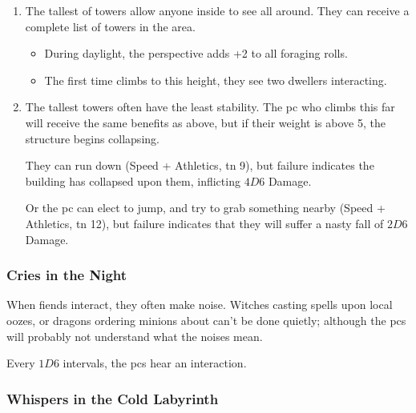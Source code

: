 \begin{multicols}{2}
\begin{enumerate}
  Any movement which disturbs the bones will send them falling down the stairs with a clank and a thud.
  \Glspl{pc} must roll Dexterity + Stealth (\gls{tn} 11) to move past the bones without issue, or else waste  moving everything down by hand (in this case they roll Dexterity + Crafts, \gls{tn} 7).
  \begin{itemize}
    \item
    During daylight, the perspective adds +2 to all foraging rolls.
  \end{itemize}
  \item
  The tallest of towers allow anyone inside to see all around.
  They can receive a complete list of towers in the area.
  \begin{itemize}
    \item
    During daylight, the perspective adds +2 to all foraging rolls.
    \item
    The first time  climbs to this height, they see two dwellers interacting.
  \end{itemize}
  \item
  The tallest towers often have the least stability.
  The \gls{pc} who climbs this far will receive the same benefits as above, but if their \gls{weight} is above 5, the structure begins collapsing.

  They can run down (Speed + Athletics, \gls{tn} 9), but failure indicates the building has collapsed upon them, inflicting $4D6$ Damage.

  Or the \gls{pc} can elect to jump, and try to grab something nearby (Speed + Athletics, \gls{tn} 12), but failure indicates that they will suffer a nasty fall of $2D6$ Damage.
\end{enumerate}

\bigLine

\subsubsection{Cries in the Night}
\label{lostCries}

When fiends interact, they often make noise.
Witches casting spells upon local oozes, or dragons ordering minions about can't be done quietly; although the \glspl{pc} will probably not understand what the noises mean.

Every $1D6$ \glspl{interval}, the \glspl{pc} hear an interaction.

\subsubsection{Whispers in the Cold Labyrinth}
\label{lostWhispers}


\end{multicols}
